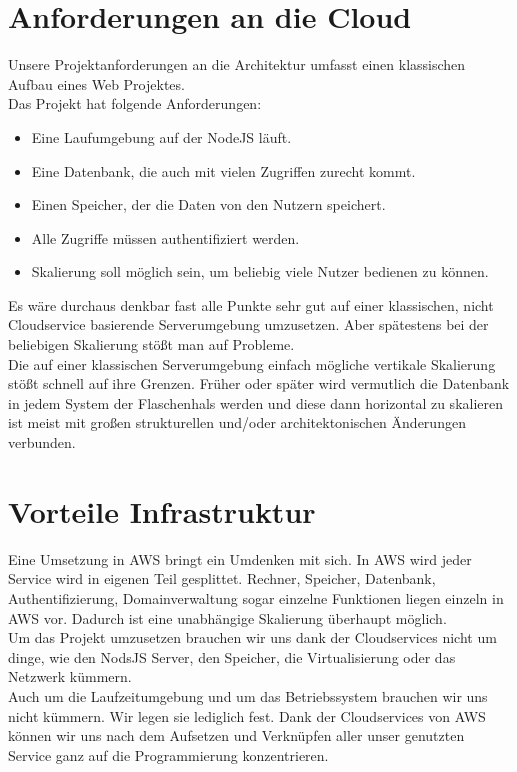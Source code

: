 \documentclass[a4paper, 12pt]{scrreprt}
\renewcommand\_{\textunderscore\allowbreak}
\begin{document}
\section{Anforderungen an die Cloud}
Unsere Projektanforderungen an die Architektur umfasst einen klassischen Aufbau eines Web Projektes. \\
Das Projekt hat folgende Anforderungen:
\begin{itemize}
\item Eine Laufumgebung auf der NodeJS läuft.
\item Eine Datenbank, die auch mit vielen Zugriffen zurecht kommt. 
\item Einen Speicher, der die Daten von den Nutzern speichert.
\item Alle Zugriffe müssen authentifiziert werden.
\item Skalierung soll möglich sein, um beliebig viele Nutzer bedienen zu können.
\end{itemize}
Es wäre durchaus denkbar fast alle Punkte sehr gut auf einer klassischen, nicht Cloudservice basierende Serverumgebung umzusetzen. Aber spätestens bei der beliebigen Skalierung stößt man auf Probleme. 
\\
Die auf einer klassischen Serverumgebung einfach mögliche vertikale Skalierung stößt schnell auf ihre Grenzen. Früher oder später wird vermutlich die Datenbank in jedem System der Flaschenhals werden und diese dann horizontal zu skalieren ist meist mit großen strukturellen und/oder architektonischen Änderungen verbunden.

\section{Vorteile Infrastruktur}
Eine Umsetzung in AWS bringt ein Umdenken mit sich. In AWS wird jeder Service wird in eigenen Teil gesplittet. Rechner, Speicher, Datenbank, Authentifizierung, Domainverwaltung sogar einzelne Funktionen liegen einzeln in AWS vor. Dadurch ist eine unabhängige Skalierung überhaupt möglich. \\
Um das Projekt umzusetzen brauchen wir uns dank der Cloudservices nicht um dinge, wie den NodsJS Server, den Speicher, die Virtualisierung oder das Netzwerk kümmern. \\
Auch um die Laufzeitumgebung und um das Betriebssystem brauchen wir uns nicht kümmern. Wir legen sie lediglich fest. Dank der Cloudservices von AWS können wir uns nach dem Aufsetzen und Verknüpfen aller unser genutzten Service ganz auf die Programmierung konzentrieren.
\end{document}
